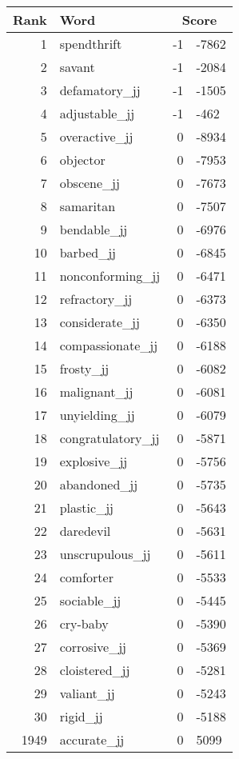 \begin{longtable}[!htbp]{| rlr@{.}l |}
    \hline
    \textbf{Rank} & \textbf{Word} & \multicolumn{2}{c|}{\textbf{Score}} \\
    \hline
    \endhead
    1 & spendthrift & -1 & -7862 \\
    2 & savant & -1 & -2084 \\
    3 & defamatory\_jj & -1 & -1505 \\
    4 & adjustable\_jj & -1 & -462 \\
    5 & overactive\_jj & 0 & -8934 \\
    6 & objector & 0 & -7953 \\
    7 & obscene\_jj & 0 & -7673 \\
    8 & samaritan & 0 & -7507 \\
    9 & bendable\_jj & 0 & -6976 \\
    10 & barbed\_jj & 0 & -6845 \\
    11 & nonconforming\_jj & 0 & -6471 \\
    12 & refractory\_jj & 0 & -6373 \\
    13 & considerate\_jj & 0 & -6350 \\
    14 & compassionate\_jj & 0 & -6188 \\
    15 & frosty\_jj & 0 & -6082 \\
    16 & malignant\_jj & 0 & -6081 \\
    17 & unyielding\_jj & 0 & -6079 \\
    18 & congratulatory\_jj & 0 & -5871 \\
    19 & explosive\_jj & 0 & -5756 \\
    20 & abandoned\_jj & 0 & -5735 \\
    21 & plastic\_jj & 0 & -5643 \\
    22 & daredevil & 0 & -5631 \\
    23 & unscrupulous\_jj & 0 & -5611 \\
    24 & comforter & 0 & -5533 \\
    25 & sociable\_jj & 0 & -5445 \\
    26 & cry-baby & 0 & -5390 \\
    27 & corrosive\_jj & 0 & -5369 \\
    28 & cloistered\_jj & 0 & -5281 \\
    29 & valiant\_jj & 0 & -5243 \\
    30 & rigid\_jj & 0 & -5188 \\
    1949 & accurate\_jj & 0 & 5099 \\

\end{longtable}
